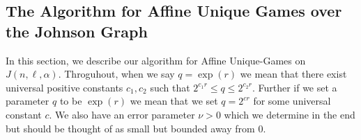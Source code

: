 \documentclass[11pt]{article}
\newtheorem{definition}[theorem]{Definition}
\theoremstyle{definition}
\begin{document}


\subsection{The Algorithm for Affine Unique Games over the Johnson Graph}
In this section, we describe our algorithm for Affine Unique-Games on $J(n,\ell,\alpha)$. Throguhout, when 
we say $q = \exp(r)$ we mean that there exist universal positive constants $c_1, c_2$ such that $2^{c_1 r} \leq q \leq 2^{c_2 r}$. Further if we set a parameter $q$ to be $\exp(r)$ we mean that we set $q = 2^{cr}$ for some universal constant $c$. We also have
an error parameter $\nu>0$ which we determine
in the end but should be thought of as small but bounded away from $0$.
\end{document}
